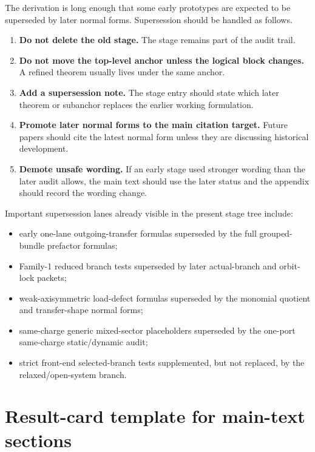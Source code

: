 The derivation is long enough that some early prototypes are expected to be superseded by later normal forms.  Supersession should be handled as follows.

\begin{enumerate}[leftmargin=2.2em]
  \item \textbf{Do not delete the old stage.}  The stage remains part of the audit trail.
  \item \textbf{Do not move the top-level anchor unless the logical block changes.}  A refined theorem usually lives under the same anchor.
  \item \textbf{Add a supersession note.}  The stage entry should state which later theorem or subanchor replaces the earlier working formulation.
  \item \textbf{Promote later normal forms to the main citation target.}  Future papers should cite the latest normal form unless they are discussing historical development.
  \item \textbf{Demote unsafe wording.}  If an early stage used stronger wording than the later audit allows, the main text should use the later status and the appendix should record the wording change.
\end{enumerate}

Important supersession lanes already visible in the present stage tree include:
\begin{itemize}[leftmargin=2.2em]
  \item early one-lane outgoing-transfer formulas superseded by the full grouped-bundle prefactor formulas;
  \item Family-1 reduced branch tests superseded by later actual-branch and orbit-lock packets;
  \item weak-axisymmetric load-defect formulas superseded by the monomial quotient and transfer-shape normal forms;
  \item same-charge generic mixed-sector placeholders superseded by the one-port same-charge static/dynamic audit;
  \item strict front-end selected-branch tests supplemented, but not replaced, by the relaxed/open-system branch.
\end{itemize}

\section{Result-card template for main-text sections}
\label{sec:result-card-template}

